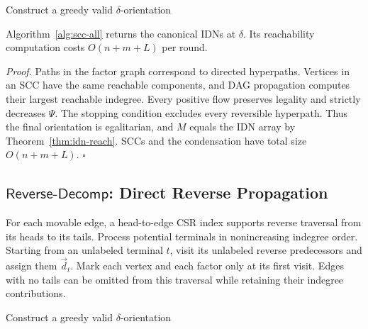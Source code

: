 \documentclass[twocolumn]{svjour3}
\newcommand{\kw}[1]{{\ensuremath{\mathsf{#1}}}\xspace}
\begin{document}
\begin{algorithm}[t]
\small
\caption{$\kw{Flow\text{-}Decomp}(\mathcal H,\delta)$}\label{alg:scc-all}
Construct a greedy valid $\delta$-orientation\;
\end{algorithm}

\begin{theorem}[Correctness of \kw{Flow\text{-}Decomp} ]\label{thm:scc-all}
Algorithm~\ref{alg:scc-all} returns the canonical IDNs at $\delta$. Its reachability computation costs $O(n+m+L)$ per round.
\end{theorem}
\emph{Proof.} Paths in the factor graph correspond to directed hyperpaths. Vertices in an SCC have the same reachable components, and DAG propagation computes their largest reachable indegree. Every positive flow preserves legality and strictly decreases $\Psi$. The stopping condition excludes every reversible hyperpath. Thus the final orientation is egalitarian, and $M$ equals the IDN array by Theorem~\ref{thm:idn-reach}. SCCs and the condensation have total size $O(n+m+L)$. \hfill$\square$

\subsection{\kw{Reverse\text{-}Decomp}: Direct Reverse Propagation}
\label{subsec:rr-all}
For each movable edge, a head-to-edge CSR index supports reverse traversal from its heads to its tails. Process potential terminals in nonincreasing indegree order. Starting from an unlabeled terminal $t$, visit its unlabeled reverse predecessors and assign them $\vec d_t$. Mark each vertex and each factor only at its first visit. Edges with no tails can be omitted from this traversal while retaining their indegree contributions.

\begin{algorithm}[t]
\small
\caption{$\kw{Reverse\text{-}Decomp}(\mathcal H,\delta)$}\label{alg:rr-reach}
Construct a greedy valid $\delta$-orientation\;
\end{algorithm}
\end{document}
